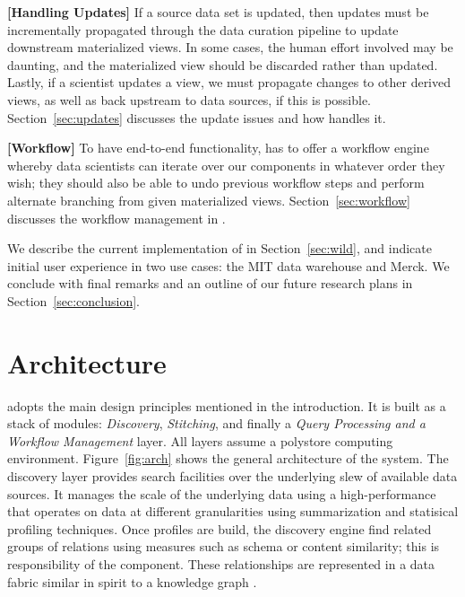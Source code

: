 {\bf [Handling Updates]}  If a source data set is updated, then
updates must be incrementally propagated through the data curation pipeline to
update downstream materialized views.  In some cases, the human effort involved may be
daunting, and the materialized view should be discarded rather than updated.  Lastly, if a
scientist updates a view, we must propagate changes to other derived views, as well as back upstream to data sources, if this is possible. Section~\ref{sec:updates} discusses the update issues and how \dcv handles it.

{\bf [Workflow]} To have end-to-end functionality, \dcv has to offer a workflow engine whereby data scientists can iterate over our components in whatever order they wish; they should also be able to undo previous workflow steps and perform alternate branching from given materialized views. Section~\ref{sec:workflow} discusses the  workflow management in \dcv.

We describe the  current implementation of \dcv  in Section~\ref{sec:wild}, and indicate initial user experience in two use cases: the  MIT data warehouse and Merck. We conclude with final remarks and an  outline of  our future research plans in Section~\ref{sec:conclusion}.


\section{Architecture}
\label{sec:arch}

\dcv adopts the main design principles mentioned in the introduction. %
It is built as a stack of modules: {\em Discovery}, {\em Stitching}, and finally 
a {\em Query Processing and a Workflow Management} layer. All layers assume a polystore computing environment. Figure~\ref{fig:arch} shows the
general architecture of the \dcv system. 
The discovery layer provides search facilities over the underlying slew of available data sources.
It manages the scale of the underlying data using a high-performance  that
operates on data at different granularities using summarization and statisical profiling techniques.
 Once profiles are build, the discovery engine find related groups of relations using
 measures  such as schema or content similarity;  this is responsibility of the
  component. These relationships are
represented in a data fabric similar in spirit to a knowledge graph
\cite{DBLP:conf/semweb/AuerBKLCI07,DBLP:conf/sigmod/BollackerEPST08,DBLP:conf/www/SuchanekKW07}.

